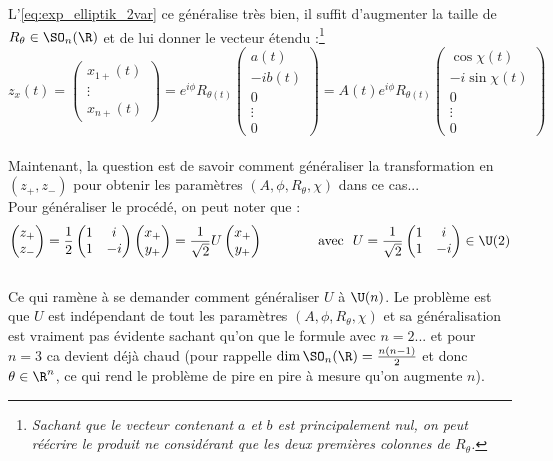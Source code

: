 L'\cref{eq:exp_elliptik_2var} ce généralise  très bien, il suffit d'augmenter la taille de $R_\theta\in\SO_n(\R)$ et de lui donner le vecteur étendu :\footnote{\textit{Sachant que le vecteur contenant $a$ et $b$ est principalement nul, on peut réécrire le produit ne considérant que les deux premières colonnes de $R_\theta$.}}
\[z_x(t) = \begin{pmatrix}x_{1+}(t) \\ \vdots \\ 
	x_{n+}(t)\end{pmatrix} = e^{i\phi} R_{\theta(t)}\begin{pmatrix} a(t) \\ -ib(t) \\ 0 \\ \vdots \\ 0 \end{pmatrix} = A(t)e^{i\phi} R_{\theta(t)} \begin{pmatrix} \cos\chi(t) \\ -i\sin\chi(t) \\ 0 \\ \vdots \\ 0 \end{pmatrix}\]
\\

Maintenant, la question est de savoir comment généraliser la transformation en $(z_+, z_-)$ pour obtenir les paramètres $(A, \phi, R_\theta, \chi)$ dans ce cas...
\\
Pour généraliser le procédé, on peut noter que :
\[\begin{pmatrix}z_+ \\ z_-\end{pmatrix} = \frac{1}{2}\begin{pmatrix}1 & i \\ 1 & -i\end{pmatrix} \begin{pmatrix}x_+ \\ y_+\end{pmatrix} = \frac{1}{\sqrt{2}}U \begin{pmatrix}x_+ \\ y_+\end{pmatrix}\qquad\qquad \text{avec }\ U=\frac{1}{\sqrt{2}}\begin{pmatrix}1 & i \\ 1 & -i\end{pmatrix}\in\U(2)\]
\\ 
Ce qui ramène à se demander comment généraliser $U$ à $\U(n)$. Le problème est que $U$ est indépendant de tout les paramètres $(A, \phi, R_\theta, \chi)$ et sa généralisation est vraiment pas évidente sachant qu'on que le formule avec $n=2$... et pour $n=3$ ca devient déjà chaud (pour rappelle $\dim \SO_n(\R)=\frac{n(n-1)}{2}$ et donc $\theta\in\R^n$, ce qui rend le problème de pire en pire à mesure qu'on augmente $n$).



